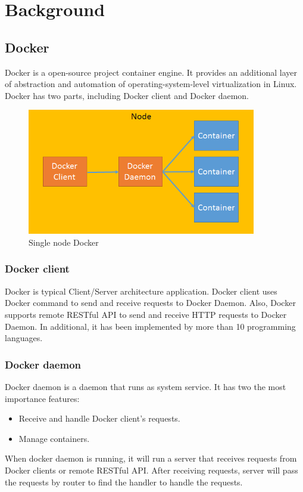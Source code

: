 \chapter{Background}
\label{chap:background}
\section{Docker}
Docker \cite{Docker} is a open-source project container engine. It provides an additional layer of abstraction and automation of operating-system-level virtualization in Linux. Docker has two parts, including Docker client and Docker daemon.

\begin{figure}[h]
\begin{center}
\includegraphics[width=10cm]{figure/single_node.png}
\end{center}
\caption{Single node Docker}
\end{figure}

\subsection{Docker client}
Docker is typical Client/Server architecture application. Docker client uses Docker command to send and receive requests to Docker Daemon. Also, Docker supports remote RESTful API to send and receive HTTP requests to Docker Daemon. In additional, it has been implemented by more than 10 programming languages.

\subsection{Docker daemon}
Docker daemon is a daemon that runs as system service. It has two the most importance features: 
\begin{itemize}
    \item Receive and handle Docker client's requests.
    \item Manage containers.
\end{itemize}
When docker daemon is running, it will run a server that receives requests from Docker clients or remote RESTful API. After receiving requests, server will pass the requests by router to find the handler to handle the requests.

